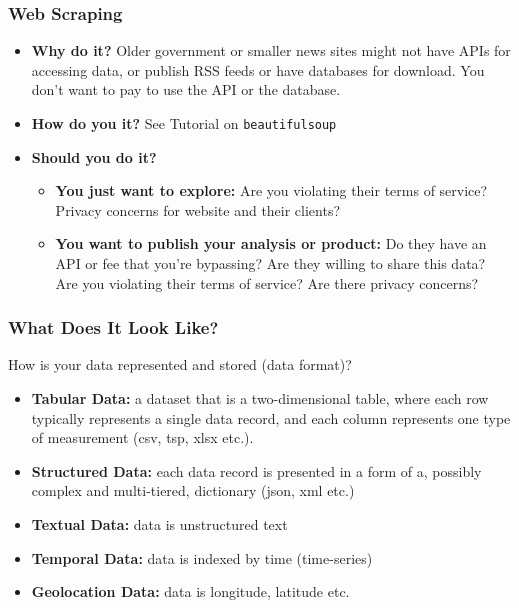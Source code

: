 \documentclass[12pt,t]{beamer}
\begin{document}
\begin{frame}
  \frametitle{Web Scraping}
  
\begin{itemize}
\item \textbf{Why do it?} Older government or smaller news sites might not have APIs for accessing data, or publish RSS feeds or have databases for download. You don't want to pay to use the API or the database.
\vskip0.2cm
\item \textbf{How do you it?} See Tutorial on \texttt{beautifulsoup}
\vskip0.2cm
\item \textbf{Should you do it?} 
\begin{itemize}
\item \textbf{You just want to explore:} Are you violating their terms of service? Privacy concerns for website and their clients?\\
\vskip0.2cm
\item \textbf{You want to publish your analysis or product:} Do they have an API or fee that you're bypassing? Are they willing to share this data? Are you violating their terms of service? Are there privacy concerns?
\end{itemize}
\end{itemize}
\end{frame}

\begin{frame}
  \frametitle{What Does It Look Like?}

How is your data represented and stored (data format)?
\footnotesize
\begin{itemize}
\item  \textbf{Tabular Data:}  a dataset that is a two-dimensional table, where each row typically represents a single data record, and each column represents one type of measurement (csv, tsp, xlsx etc.). 
\vskip0.2cm
\item   \textbf{Structured Data:} each data record is presented in a form of a, possibly complex and multi-tiered, dictionary (json, xml etc.)
\vskip0.2cm
\item   \textbf{Textual Data:} data is unstructured text
\vskip0.2cm
\item   \textbf{Temporal Data:} data is indexed by time (time-series)
\vskip0.2cm
\item   \textbf{Geolocation Data:} data is longitude, latitude etc.
\vskip0.2cm
\end{itemize}
\end{frame}
\end{document}
